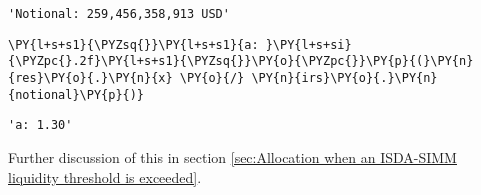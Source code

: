             \begin{tcolorbox}[breakable, size=fbox, boxrule=.5pt, pad at break*=1mm, opacityfill=0]
\begin{Verbatim}[commandchars=\\\{\}]
'Notional: 259,456,358,913 USD'
\end{Verbatim}
\end{tcolorbox}
        
    \begin{tcolorbox}[breakable, size=fbox, boxrule=1pt, pad at break*=1mm,colback=cellbackground, colframe=cellborder]
\begin{Verbatim}[commandchars=\\\{\}]
\PY{l+s+s1}{\PYZsq{}}\PY{l+s+s1}{a: }\PY{l+s+si}{\PYZpc{}.2f}\PY{l+s+s1}{\PYZsq{}}\PY{o}{\PYZpc{}}\PY{p}{(}\PY{n}{res}\PY{o}{.}\PY{n}{x} \PY{o}{/} \PY{n}{irs}\PY{o}{.}\PY{n}{notional}\PY{p}{)}
\end{Verbatim}
\end{tcolorbox}

            \begin{tcolorbox}[breakable, size=fbox, boxrule=.5pt, pad at break*=1mm, opacityfill=0]
\begin{Verbatim}[commandchars=\\\{\}]
'a: 1.30'
\end{Verbatim}
\end{tcolorbox}
        
    Further discussion of this in section
\ref{sec:Allocation when an ISDA-SIMM liquidity threshold is exceeded}.


